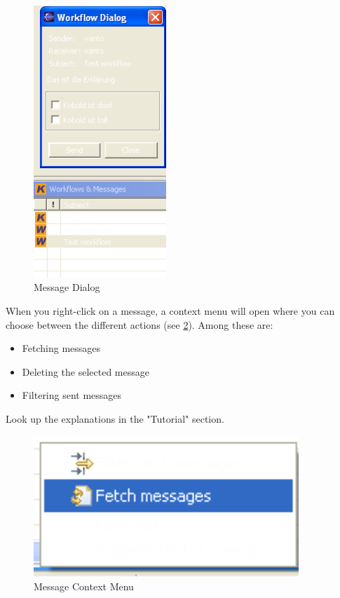 \begin{figure}[h!]
\begin{center}
\includegraphics[width=5cm]{workflowdialog.png}
   \caption{Message Dialog}
\label{workflowdialog}
\end{center}
\end{figure}\par

When you right-click on a message, a context menu will open where you can choose 
between the different actions (see \ref{workflowkontext}). Among these are:

\begin{itemize}
	\item Fetching messages
	\item Deleting the selected message
	\item Filtering sent messages
\end{itemize}
Look up the explanations in the "Tutorial" section.

\begin{figure}[h!]
\begin{center}
\includegraphics[width=10cm]{workflowkontext.png}
   \caption{Message Context Menu}
\label{workflowkontext}
\end{center}
\end{figure}\par

